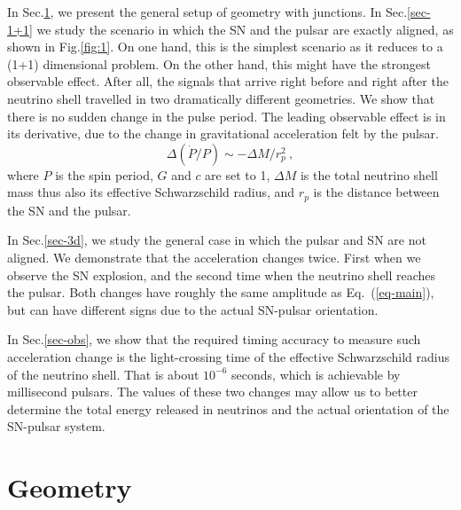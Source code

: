 \documentclass[aps,showpacs,twocolumn,floats,prd,superscriptaddress,nofootinbib]{revtex4-1}
\begin{document}
In Sec.\ref{sec-JC}, we present the general setup of geometry with junctions. In Sec.\ref{sec-1+1} we study the scenario in which the SN and the pulsar are exactly aligned, as shown in Fig.\ref{fig:1}. On one hand, this is the simplest scenario as it reduces to a (1+1) dimensional problem. On the other hand, this might have the strongest observable effect. After all, the signals that arrive right before and right after the neutrino shell travelled in two dramatically different geometries. We show that there is no sudden change in the pulse period.
The leading observable effect is in its derivative, due to the change in gravitational acceleration felt by the pulsar. 
\begin{equation}
\Delta(\dot{P}/P) \sim -\Delta M / r_p^2~,
\label{eq-main}
\end{equation}
where $P$ is the spin period, $G$ and $c$ are set to 1, $\Delta M$ is the total neutrino shell mass thus also its effective Schwarzschild radius, and $r_p$ is the distance between the SN and the pulsar. 

In Sec.\ref{sec-3d}, we study the general case in which the pulsar and SN are not aligned. We demonstrate that the acceleration changes twice. First when we observe the SN explosion, and the second time when the neutrino shell reaches the pulsar. Both changes have roughly the same amplitude as Eq.~(\ref{eq-main}), but can have different signs due to the actual SN-pulsar orientation. 

In Sec.\ref{sec-obs}, we show that the required timing accuracy to measure such acceleration change is the light-crossing time of the effective Schwarzschild radius of the neutrino shell. That is about $10^{-6}$ seconds, which is achievable by millisecond pulsars. The values of these two changes may allow us to better determine the total energy released in neutrinos and the actual orientation of the SN-pulsar system.

\section{Geometry}
\label{sec-JC}
\end{document}
